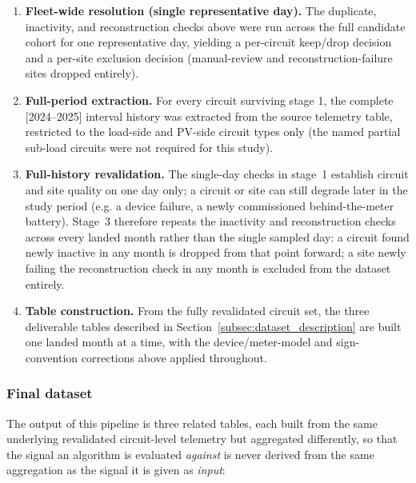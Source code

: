 \begin{enumerate}
  \item \textbf{Fleet-wide resolution (single representative day).} The
    duplicate, inactivity, and reconstruction checks above were run
    across the full candidate cohort for one representative day, yielding
    a per-circuit keep/drop decision and a per-site exclusion decision
    (manual-review and reconstruction-failure sites dropped entirely).
  \item \textbf{Full-period extraction.} For every circuit surviving
    stage 1, the complete [2024--2025] interval history was extracted
    from the source telemetry table, restricted to the load-side and
    PV-side circuit types only (the named partial sub-load circuits were
    not required for this study).
  \item \textbf{Full-history revalidation.} The single-day checks in
    stage~1 establish circuit and site quality on one day only; a circuit
    or site can still degrade later in the study period (e.g. a device
    failure, a newly commissioned behind-the-meter battery). Stage~3
    therefore repeats the inactivity and reconstruction checks across
    every landed month rather than the single sampled day: a circuit
    found newly inactive in any month is dropped from that point forward;
    a site newly failing the reconstruction check in any month is
    excluded from the dataset entirely.
  \item \textbf{Table construction.} From the fully revalidated circuit
    set, the three deliverable tables described in
    Section~\ref{subsec:dataset_description} are built one landed month
    at a time, with the device/meter-model and sign-convention
    corrections above applied throughout.
\end{enumerate}

\subsubsection*{Final dataset}
The output of this pipeline is three related tables, each built from the
same underlying revalidated circuit-level telemetry but aggregated
differently, so that the signal an algorithm is evaluated \emph{against}
is never derived from the same aggregation as the signal it is given as
\emph{input}:

